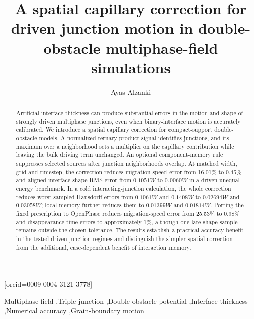 \documentclass[a4paper]{cas-sc}
\begin{document}
\title[mode=title]{A spatial capillary correction for driven junction motion in double-obstacle multiphase-field simulations}
\author[1]{Ayas Alzanki}[orcid=0009-0004-3121-3778]
\cormark[1]
\begin{abstract}
Artificial interface thickness can produce substantial errors in the motion and shape of strongly driven multiphase junctions, even when binary-interface motion is accurately calibrated. We introduce a spatial capillary correction for compact-support double-obstacle models. A normalized ternary-product signal identifies junctions, and its maximum over a neighborhood sets a multiplier on the capillary contribution while leaving the bulk driving term unchanged. An optional component-memory rule suppresses selected sources after junction neighborhoods overlap. At matched width, grid and timestep, the correction reduces migration-speed error from 16.01\% to 0.45\% and aligned interface-shape RMS error from $0.1051W$ to $0.0060W$ in a driven unequal-energy benchmark. In a cold interacting-junction calculation, the whole correction reduces worst sampled Hausdorff errors from $0.1061W$ and $0.1408W$ to $0.02694W$ and $0.03058W$; local memory further reduces them to $0.01399W$ and $0.01814W$. Porting the fixed prescription to OpenPhase reduces migration-speed error from 25.53\% to 0.98\% and disappearance-time errors to approximately 1\%, although one late shape sample remains outside the chosen tolerance. The results establish a practical accuracy benefit in the tested driven-junction regimes and distinguish the simpler spatial correction from the additional, case-dependent benefit of interaction memory.
\end{abstract}
\begin{keywords}
Multiphase-field \sep Triple junction \sep Double-obstacle potential \sep Interface thickness \sep Numerical accuracy \sep Grain-boundary motion
\end{keywords}
\maketitle
{}




{\raggedright


}
\end{document}
